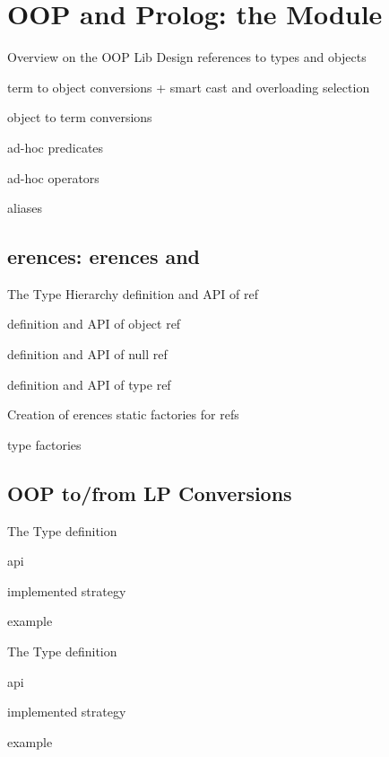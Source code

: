 \documentclass[handout]{beamer}
\begin{document}
\section{OOP and Prolog: the  Module}

\begin{frame}[allowframebreaks]{Overview on the OOP Lib Design}
    references to types and objects

    term to object conversions
        + smart cast and overloading selection

    object to term conversions

    ad-hoc predicates

    ad-hoc operators

    aliases
\end{frame}

\subsection{erences: erences and }

\begin{frame}[allowframebreaks]{The  Type Hierarchy}
    definition and API of ref

    definition and API of object ref

    definition and API of null ref

    definition and API of type ref
\end{frame}

\begin{frame}[allowframebreaks]{Creation of erences}
    static factories for refs

    type factories
\end{frame}

\subsection{OOP to/from LP Conversions}

\begin{frame}[allowframebreaks]{The  Type}
    definition

    api

    implemented strategy

    example
\end{frame}

\begin{frame}[allowframebreaks]{The  Type}
    definition

    api

    implemented strategy

    example
\end{frame}
\end{document}
